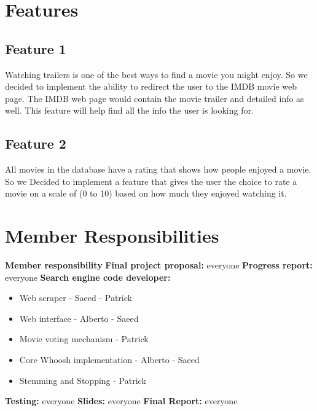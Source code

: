 \documentclass[11pt]{article}
\begin{document}
\section{Features}
\subsection{Feature 1}
Watching trailers is one of the best ways to find a movie you might enjoy. So we decided to implement the ability to redirect the user to the IMDB movie web page. The IMDB web page would contain the movie trailer and detailed info as well. This feature will help find all the info the user is looking for.    

\subsection{Feature 2}
All movies in the database have a rating that shows how people enjoyed a movie. So we Decided to implement a feature that gives the user the choice to rate a movie on a scale of (0 to 10) based on how much they enjoyed watching it.

\section{Member Responsibilities}
\textbf{Member responsibility} \newline
\textbf{Final project proposal:} everyone \newline
\textbf{Progress report:} everyone\newline
\textbf{Search engine code developer:}
\begin{itemize}
    \item Web scraper - Saeed - Patrick
    \item Web interface - Alberto - Saeed
    \item Movie voting mechanism - Patrick
    \item Core Whoosh implementation - Alberto - Saeed
    \item Stemming and Stopping - Patrick
\end{itemize}
\textbf{Testing:} everyone \newline
\textbf{Slides:} everyone \newline
\textbf{Final Report:} everyone


%
%
\end{document}
